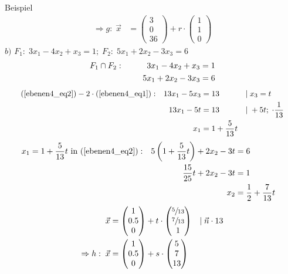 \documentclass{article}
\begin{document}
\begin{boxx}[DarkBlue]{Beispiel}
\begin{align*}
        \Rightarrow g:\;\vec{x} &= \begin{pmatrix}3\\0\\36\end{pmatrix} + r \cdot \begin{pmatrix}1\\1\\0\end{pmatrix}
    \end{align*}
    $b)$\hspace{3mm} $F_1:\; 3x_1 - 4x_2 + x_3 = 1;\; F_2:\;5x_1 + 2x_2 - 3x_3 = 6$
    \begin{align}
        F_1 \cap F_2: \hspace*{10mm}3x_1 - 4x_2 + x_3 &= 1 \label{ebenen4_eq1}\\
        5x_1 + 2x_2 - 3x_3 &= 6 \label{ebenen4_eq2}
    \end{align}
    \begin{align*}
        &&&&&\text{(\ref{ebenen4_eq2})} - 2\cdot\text{(\ref{ebenen4_eq1})}: & 13x_1 - 5x_3 &= 13&&|\;x_3=t&&&& \\
        &&&&&& 13x_1 -5t &= 13 &&|\;+5t;\;\cdot \frac{1}{13}\\
        &&&&&& x_1 &= 1 + \frac{5}{13}t && \\
    \end{align*}
    \begin{align*}
        &&&&&x_1 = 1 + \frac{5}{13}t \text{ in (\ref{ebenen4_eq2})}: &5\left(1+\frac{5}{13}t\right)+2x_2 -3t &= 6&&&&&& \\
        &&&&&&\frac{15}{25}t + 2x_2 -3t &= 1 \\
        &&&&&& x_2 &= \frac{1}{2} + \frac{7}{13}t
    \end{align*}
    \begin{align*}
        &&\vec{x} &= \begin{pmatrix}1\\0.5\\0\end{pmatrix} + t \cdot \begin{pmatrix}\sfrac{5}{13}\\\sfrac{7}{13}\\1\end{pmatrix} &&|\;\vec{n} \cdot 13&&\\
        &&\Rightarrow h:\;\vec{x} &= \begin{pmatrix}1\\0.5\\0\end{pmatrix} + s \cdot \begin{pmatrix}5\\7\\13\end{pmatrix}
    \end{align*}
\end{boxx}
\newpage
\end{document}
